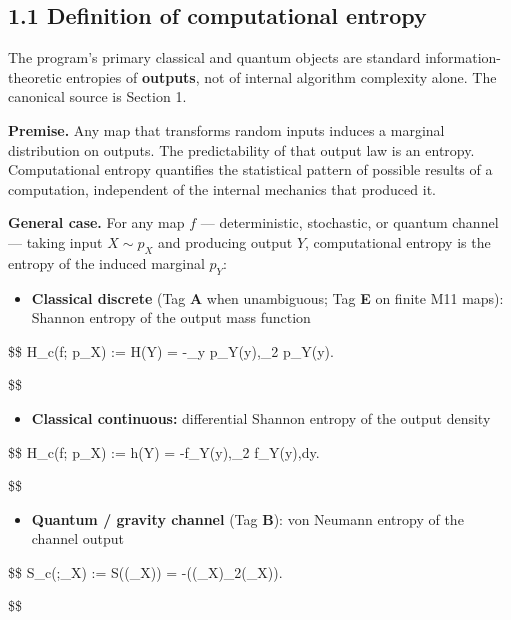 \documentclass[
  11pt,
]{article}
\providecommand{\tightlist}{%
  \setlength{\itemsep}{0pt}\setlength{\parskip}{0pt}}
\begin{document}
\subsection{1.1 Definition of computational
entropy}\label{definition-of-computational-entropy}

The program's primary classical and quantum objects are standard
information-theoretic entropies of \textbf{outputs}, not of internal
algorithm complexity alone. The canonical source is Section 1.

\textbf{Premise.} Any map that transforms random inputs induces a
marginal distribution on outputs. The predictability of that output law
is an entropy. Computational entropy quantifies the statistical pattern
of possible results of a computation, independent of the internal
mechanics that produced it.

\textbf{General case.} For any map \(f\) --- deterministic, stochastic,
or quantum channel --- taking input \(X\sim p_X\) and producing output
\(Y\), computational entropy is the entropy of the induced marginal
\(p_Y\):

\begin{itemize}
\tightlist
\item
  \textbf{Classical discrete} (Tag \textbf{A} when unambiguous; Tag
  \textbf{E} on finite M11 maps): Shannon entropy of the output mass
  function
\end{itemize}

\$\$ H\_c(f; p\_X) := H(Y) = -\sum\_y p\_Y(y),\log\_2 p\_Y(y).

\$\$

\begin{itemize}
\tightlist
\item
  \textbf{Classical continuous:} differential Shannon entropy of the
  output density
\end{itemize}

\$\$ H\_c(f; p\_X) := h(Y) = -\int f\_Y(y),\log\_2 f\_Y(y),dy.

\$\$

\begin{itemize}
\tightlist
\item
  \textbf{Quantum / gravity channel} (Tag \textbf{B}): von Neumann
  entropy of the channel output
\end{itemize}

\$\$ S\_c(\Phi;\rho\_X) := S\bigl(\Phi(\rho\_X)\bigr) =
-\bigl(\Phi(\rho\_X)\log\_2\Phi(\rho\_X)\bigr).

\$\$
\end{document}
